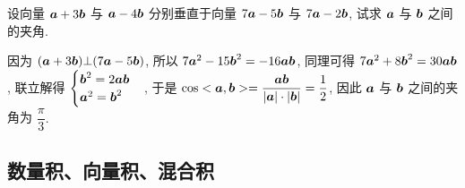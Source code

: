 \begin{example}
    设向量 $\vb*{a}+3\vb*{b}$ 与 $\vb*{a}-4\vb*{b}$ 分别垂直于向量 $7\vb*{a}-5\vb*{b}$ 与 $7\vb*{a}-2\vb*{b}$, 试求 $\vb*{a}$ 与 $\vb*{b}$ 之间的夹角.
\end{example}
\begin{solution}
    因为 $\qty(\vb*{a}+3\vb*{b})\bot \qty(7\vb*{a}-5\vb*{b})$, 所以 $7\vb*{a}^2-15\vb*{b}^2=-16\vb*{ab}$, 同理可得 $7\vb*{a}^2+8\vb*{b}^2=30\vb*{ab}$, 
    联立解得 $\begin{cases}
            \vb*{b}^2=2\vb*{ab} \\\vb*{a}^2=\vb*{b}^2
        \end{cases}$, 于是 $\cos<\vb*{a},\vb*{b}>=\dfrac{\vb*{ab}}{|\vb*{a}|\cdot|\vb*{b}|}=\dfrac{1}{2}$, 因此 $\vb*{a}$ 与 $\vb*{b}$ 之间的夹角为 $\dfrac{\pi}{3} .$
\end{solution}


\subsection{数量积、向量积、混合积}

